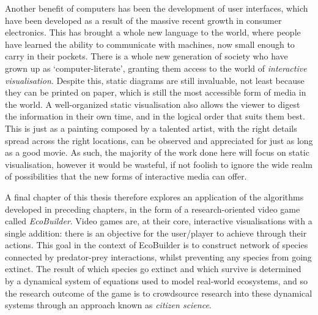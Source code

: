 Another benefit of computers has been the development of user interfaces, which have been developed as a result of the massive recent growth in consumer electronics. This has brought a whole new language to the world, where people have learned the ability to communicate with machines, now small enough to carry in their pockets. There is a whole new generation of society who have grown up as `computer-literate', granting them access to the world of \emph{interactive visualisation}. Despite this, static diagrams are still invaluable, not least because they can be printed on paper, which is still the most accessible form of media in the world. A well-organized static visualisation also allows the viewer to digest the information in their own time, and in the logical order that suits them best. This is just as a painting composed by a talented artist, with the right details spread across the right locations, can be observed and appreciated for just as long as a good movie.
As such, the majority of the work done here will focus on static visualisation, however it would be wasteful, if not foolish to ignore the wide realm of possibilities that the new forms of interactive media can offer.

A final chapter of this thesis therefore explores an application of the algorithms developed in preceding chapters, in the form of a research-oriented video game called \emph{EcoBuilder}. Video games are, at their core, interactive visualisations with a single addition: there is an objective for the user/player to achieve through their actions. This goal in the context of EcoBuilder is to construct network of species connected by predator-prey interactions, whilst preventing any species from going extinct. The result of which species go extinct and which survive is determined by a dynamical system of equations used to model real-world ecosystems, and so the research outcome of the game is to crowdsource research into these dynamical systems through an approach known as \emph{citizen science}.

